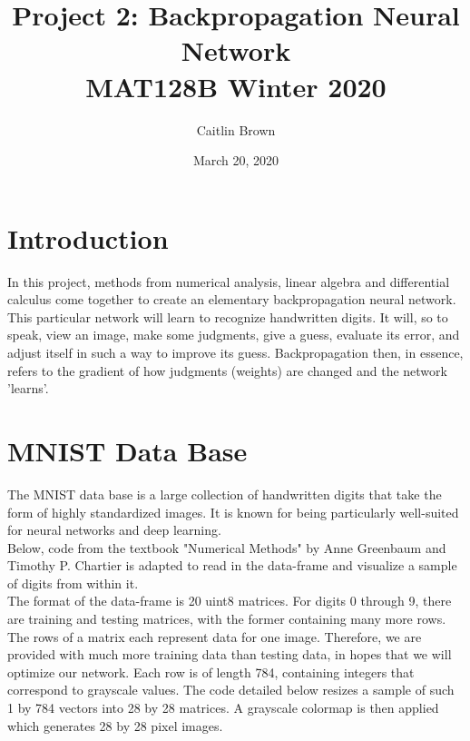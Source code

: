 \documentclass[letterpaper,11pt]{article}
\begin{document}
\title{Project 2: Backpropagation Neural Network\\
	\large MAT128B Winter 2020}
\author{Caitlin Brown}
\date{March 20, 2020}
\maketitle
\tableofcontents
\newpage

\section*{Introduction}

In this project, methods from numerical analysis, linear algebra and differential calculus come together to create an elementary backpropagation neural network. This particular network will learn to recognize handwritten digits. It will, so to speak, view an image, make some judgments, give a guess, evaluate its error, and adjust itself in such a way to improve its guess. Backpropagation then, in essence, refers to the gradient of how judgments (weights) are changed and the network 'learns'.


\section{MNIST Data Base}

The MNIST data base is a large collection of handwritten digits that take the form of highly standardized images. It is known for being particularly well-suited for neural networks and deep learning.\\

Below, code from the textbook "Numerical Methods" by Anne Greenbaum and Timothy P. Chartier is adapted to read in the data-frame and visualize a sample of digits from within it.\\

The format of the data-frame is 20 uint8 matrices. For digits 0 through 9, there are training and testing matrices, with the former containing many more rows. The rows of a matrix each represent data for one image. Therefore, we are provided with much more training data than testing data, in hopes that we will optimize our network. Each row is of length 784, containing integers that correspond to grayscale values. The code detailed below resizes a sample of such 1 by 784 vectors into 28 by 28 matrices. A grayscale colormap is then applied which generates 28 by 28 pixel images. 
\end{document}
